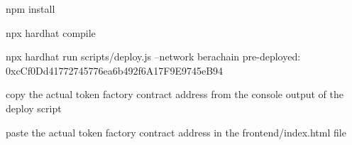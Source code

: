 npm install

npx hardhat compile

npx hardhat run scripts/deploy.js --network berachain
    pre-deployed: 0xcCf0Dd41772745776ea6b492f6A17F9E9745eB94

copy the actual token factory contract address from the console output of the deploy script

paste the actual token factory contract address in the frontend/index.html file

